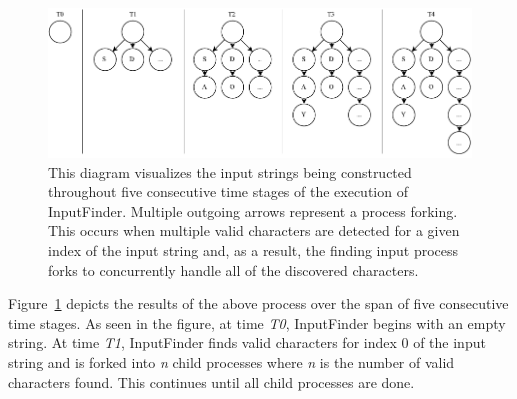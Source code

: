 \documentclass{sig-alternate-05-2015}
\def \tool {InputFinder}
\begin{document}
\begin{figure}[t]
\centering
\includegraphics[width=\textwidth]{string_builder.pdf}
\caption{This diagram visualizes the input strings being constructed throughout five consecutive time stages of the execution of 
\tool{}. Multiple outgoing arrows represent a process forking. This occurs when multiple valid characters are detected for a given index of the input string and, as a result, the finding input process forks to concurrently handle all of the discovered characters.}
\label{fig:string_builder}
\end{figure}

Figure~\ref{fig:string_builder} depicts the results of the above process over the span of five consecutive time stages.
As seen in the figure, at time \textit{T0}, \tool{} begins with an empty string.
At time \textit{T1}, \tool{} finds valid characters for index 0 of the input string and is forked into \textit{n} child processes where \textit{n} is the number of valid characters found.
This continues until all child processes are done.
\end{document}

